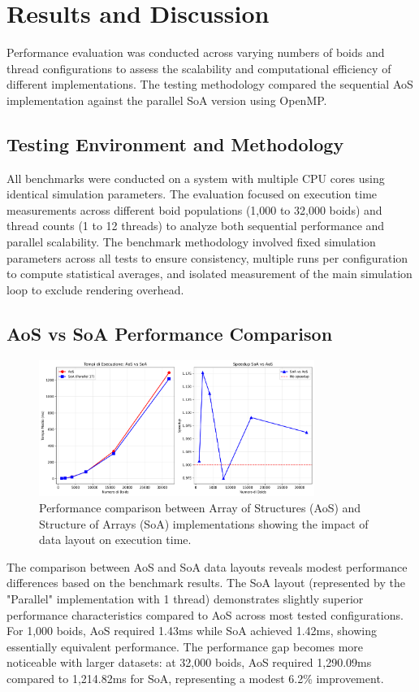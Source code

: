 \documentclass[10pt,twocolumn,letterpaper]{article}
\begin{document}
\section{Results and Discussion}

Performance evaluation was conducted across varying numbers of boids and thread configurations to assess the scalability and computational efficiency of different implementations. The testing methodology compared the sequential AoS implementation against the parallel SoA version using OpenMP.

\subsection{Testing Environment and Methodology}
All benchmarks were conducted on a system with multiple CPU cores using identical simulation parameters. The evaluation focused on execution time measurements across different boid populations (1,000 to 32,000 boids) and thread counts (1 to 12 threads) to analyze both sequential performance and parallel scalability. The benchmark methodology involved fixed simulation parameters across all tests to ensure consistency, multiple runs per configuration to compute statistical averages, and isolated measurement of the main simulation loop to exclude rendering overhead.

\subsection{AoS vs SoA Performance Comparison}

\begin{figure}[t]
\centering
\includegraphics[width=0.8\textwidth]{../../images/aos_vs_soa.png}
\caption{Performance comparison between Array of Structures (AoS) and Structure of Arrays (SoA) implementations showing the impact of data layout on execution time.}
\label{fig:aos_vs_soa}
\end{figure}

The comparison between AoS and SoA data layouts reveals modest performance differences based on the benchmark results. The SoA layout (represented by the "Parallel" implementation with 1 thread) demonstrates slightly superior performance characteristics compared to AoS across most tested configurations. For 1,000 boids, AoS required 1.43ms while SoA achieved 1.42ms, showing essentially equivalent performance. The performance gap becomes more noticeable with larger datasets: at 32,000 boids, AoS required 1,290.09ms compared to 1,214.82ms for SoA, representing a modest 6.2\% improvement.
\end{document}
